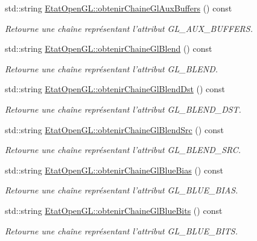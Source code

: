 \begin{DoxyCompactItemize}
std\-::string \hyperlink{group__utilitaire_gab8c780e176faece6cbaa11084e957e8d}{Etat\-Open\-G\-L\-::obtenir\-Chaine\-Gl\-Aux\-Buffers} () const 
\begin{DoxyCompactList}\small\item\em Retourne une chaîne représentant l'attribut G\-L\-\_\-\-A\-U\-X\-\_\-\-B\-U\-F\-F\-E\-R\-S. \end{DoxyCompactList}\item 
std\-::string \hyperlink{group__utilitaire_ga8a5f949f2b7a9a911c0677d639bebae5}{Etat\-Open\-G\-L\-::obtenir\-Chaine\-Gl\-Blend} () const 
\begin{DoxyCompactList}\small\item\em Retourne une chaîne représentant l'attribut G\-L\-\_\-\-B\-L\-E\-N\-D. \end{DoxyCompactList}\item 
std\-::string \hyperlink{group__utilitaire_gaa52ab39bcb62d4f8777afddfca458650}{Etat\-Open\-G\-L\-::obtenir\-Chaine\-Gl\-Blend\-Dst} () const 
\begin{DoxyCompactList}\small\item\em Retourne une chaîne représentant l'attribut G\-L\-\_\-\-B\-L\-E\-N\-D\-\_\-\-D\-S\-T. \end{DoxyCompactList}\item 
std\-::string \hyperlink{group__utilitaire_ga510a36fe5d3e313756e40b5c67b516ba}{Etat\-Open\-G\-L\-::obtenir\-Chaine\-Gl\-Blend\-Src} () const 
\begin{DoxyCompactList}\small\item\em Retourne une chaîne représentant l'attribut G\-L\-\_\-\-B\-L\-E\-N\-D\-\_\-\-S\-R\-C. \end{DoxyCompactList}\item 
std\-::string \hyperlink{group__utilitaire_ga95f9a6baabd65a0cdd4b1e5cbeb4f678}{Etat\-Open\-G\-L\-::obtenir\-Chaine\-Gl\-Blue\-Bias} () const 
\begin{DoxyCompactList}\small\item\em Retourne une chaîne représentant l'attribut G\-L\-\_\-\-B\-L\-U\-E\-\_\-\-B\-I\-A\-S. \end{DoxyCompactList}\item 
std\-::string \hyperlink{group__utilitaire_ga125172f1c5c4ef27c20c4e52a70ce38a}{Etat\-Open\-G\-L\-::obtenir\-Chaine\-Gl\-Blue\-Bits} () const 
\begin{DoxyCompactList}\small\item\em Retourne une chaîne représentant l'attribut G\-L\-\_\-\-B\-L\-U\-E\-\_\-\-B\-I\-T\-S. \end{DoxyCompactList}\item 

\end{DoxyCompactItemize}
